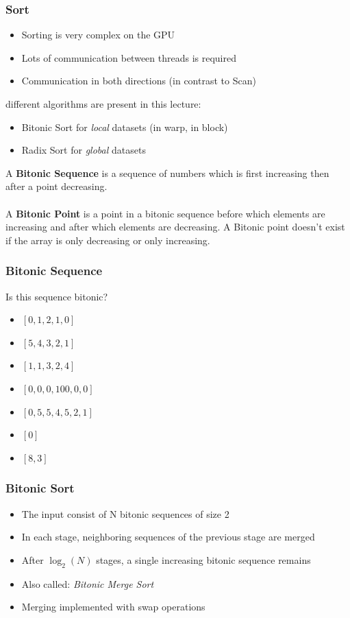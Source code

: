 \documentclass[aspectratio=169,handout]{beamer}
\begin{document}
\frame
{
	\frametitle{Sort}
	\begin{itemize}
		\item Sorting is very complex on the GPU
		\item<2-> Lots of communication between threads is required
		\item<2-> Communication in both directions (in contrast to Scan)
	\end{itemize}
 different algorithms are present in this lecture:
\begin{itemize}
	\item<4-> Bitonic Sort for \textit{local} datasets (in warp, in block)
	\item<5-> Radix Sort for \textit{global} datasets
\end{itemize}
}

\frame
{
	\begin{mdframed}[frametitle={Bitonic Sequence}]
		A \textbf{Bitonic Sequence} is a sequence of numbers which is first increasing then after a point decreasing.
		\\ \\
		A \textbf{Bitonic Point} is a point in a bitonic sequence before which elements are increasing and after which elements are decreasing. A Bitonic point doesn’t exist if the array is only decreasing or only increasing.
	\end{mdframed}
}


\frame
{
		\frametitle{Bitonic Sequence}
		Is this sequence bitonic?
		\begin{itemize}
			\item<1-2>[] $[0, 1, 2, 1, 0]$ \onslide<2>{Yes}
			\item<3-4>[] $[5,4,3,2,1]$ \onslide<4>{Yes}
			\item<5-6>[] $[1, 1, 3, 2, 4]$ \onslide<6>{No}
			\item<7-8>[] $[0, 0,0, 100, 0, 0]$ \onslide<8>{Yes}
			\item<9-10>[] $[0, 5,5,4,5, 2, 1]$ \onslide<10>{No}
			\item<11-12>[] $[0]$ \onslide<12>{Yes}
			\item<13-14>[] $[8, 3]$ \onslide<14>{Yes}
		\end{itemize}
}

\frame
{
	\frametitle{Bitonic Sort}
\begin{itemize}
	\item The input consist of N bitonic sequences of size 2
	\item<2-> In each stage, neighboring sequences of the previous stage are merged
	\item<3-> After $\log_2(N)$ stages, a single increasing bitonic sequence remains

	\item<4->[$\rightarrow$] Also called: \textit{Bitonic Merge Sort}
	\item<5->[$\rightarrow$] Merging implemented with swap operations
\end{itemize}
}
\end{document}
